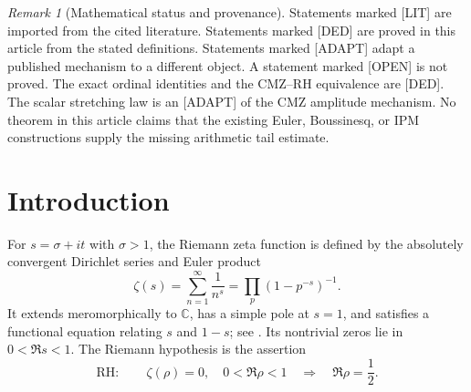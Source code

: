 \documentclass[11pt]{amsart}
\numberwithin{equation}{section}
\theoremstyle{plain}
\theoremstyle{definition}
\theoremstyle{remark}
\newtheorem{remark}[theorem]{Remark}
\newcommand{\C}{\mathbb C}
\newcommand{\RH}{\mathrm{RH}}
\begin{document}
\begin{abstract}
proportional to $|M(s_q)|$.  We prove this finite-stage statement with its
harmonic-capacity, support, boundary, and multiplier hypotheses.  Two
estimates were proposed as jointly sufficient for an RH proof: control of
later CMZ corrections, and an upper bound on the normalised residual claimed
to be obtainable by a fluid estimate independent of Mertens cancellation.  We
show the second claim is false as stated: an exact identity
(Proposition~\ref{prop:readout-rigidity}) identifies the normalised residual
with $M(s_q)$ up to a fixed factor, so no independent bound on it exists even
in principle --- proving it is proving the arithmetic statement, not a route
to it.  Only the first estimate, about the correction cascade alone, remains
a genuinely open and non-circular question, and its resolution would not by
itself yield new arithmetic information.
\end{abstract}

\maketitle

\tableofcontents

\bigskip

\begin{remark}[Mathematical status and provenance]
\label{rem:status}
Statements marked \textup{[LIT]} are imported from the cited literature.
Statements marked \textup{[DED]} are proved in this article from the stated
definitions.  Statements marked \textup{[ADAPT]} adapt a published mechanism
to a different object.  A statement marked \textup{[OPEN]} is not proved.
The exact ordinal identities and the CMZ--RH equivalence are \textup{[DED]}.
The scalar stretching law is an \textup{[ADAPT]} of the CMZ amplitude
mechanism.  No theorem in this article claims that the existing Euler,
Boussinesq, or IPM constructions supply the missing arithmetic tail estimate.
\end{remark}

\section{Introduction}
\label{sec:introduction}

For $s=\sigma+it$ with $\sigma>1$, the Riemann zeta function is defined by
the absolutely convergent Dirichlet series and Euler product
\begin{equation}
\zeta(s)=\sum_{n=1}^{\infty}\frac1{n^s}
=\prod_p\left(1-p^{-s}\right)^{-1}.
\label{eq:zeta-series-product}
\end{equation}
It extends meromorphically to $\C$, has a simple pole at $s=1$, and satisfies
a functional equation relating $s$ and $1-s$; see
\cite{Titchmarsh1986,Apostol1976}.  Its nontrivial zeros lie in
$0<\Re s<1$.  The Riemann hypothesis is the assertion
\begin{equation}
\RH:\qquad \zeta(\rho)=0,\quad 0<\Re\rho<1
\quad\Longrightarrow\quad \Re\rho=\frac12.
\label{eq:RH-statement}
\end{equation}
\end{document}
